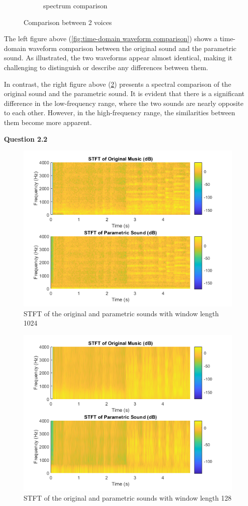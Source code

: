 \documentclass[journal,12pt,onecolumn,draftclsnofoot]{IEEEtran}
\begin{document}
\begin{figure}[H]
\begin{subfigure}[b]{0.45\linewidth}
                \caption[short]{spectrum comparison}
                \label{fig:spectrum comparison}
            \end{subfigure}
            \caption{Comparison between 2 voices}
        \end{figure}

        The left figure above (\ref{fig:time-domain waveform comparison}) shows a time-domain waveform comparison between the original sound and the parametric sound. 
        As illustrated, the two waveforms appear almost identical, making it challenging to distinguish or describe any differences between them.

        In contrast, the right figure above (\ref{fig:spectrum comparison}) presents a spectral comparison of the original sound and the parametric sound. 
        It is evident that there is a significant difference in the low-frequency range, where the two sounds are nearly opposite to each other. 
        However, in the high-frequency range, the similarities between them become more apparent.
        \newpage

    \noindent \textbf{Question 2.2}
        \begin{figure}[H]
            \centering
                \includegraphics[width=0.7\linewidth]{figures/STFT result 1024.png}
            \caption{STFT of the original and parametric sounds with window length 1024}
            \label{fig:STFT result 1024}
        \end{figure}
        \begin{figure}[H]
            \centering
                \includegraphics[width=0.7\linewidth]{figures/STFT result 128.png}
            \caption{STFT of the original and parametric sounds with window length 128}
            \label{fig:STFT result 128}
        \end{figure}
\end{document}
